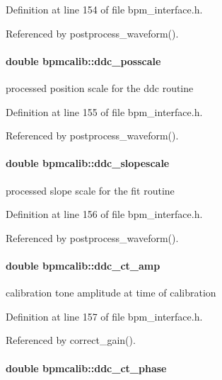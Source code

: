 Definition at line 154 of file bpm\_\-interface.h.

Referenced by postprocess\_\-waveform().
\paragraph[ddc\_\-posscale]{\setlength{\rightskip}{0pt plus 5cm}double {\bf bpmcalib::ddc\_\-posscale}}\hfill\label{structbpmcalib_3ed4fc09eb4f328fe6f3013fe5d83efb}


processed position scale for the ddc routine 

Definition at line 155 of file bpm\_\-interface.h.

Referenced by postprocess\_\-waveform().
\paragraph[ddc\_\-slopescale]{\setlength{\rightskip}{0pt plus 5cm}double {\bf bpmcalib::ddc\_\-slopescale}}\hfill\label{structbpmcalib_04bf942ef5b05de845c388ac355c5fa7}


processed slope scale for the fit routine 

Definition at line 156 of file bpm\_\-interface.h.

Referenced by postprocess\_\-waveform().
\paragraph[ddc\_\-ct\_\-amp]{\setlength{\rightskip}{0pt plus 5cm}double {\bf bpmcalib::ddc\_\-ct\_\-amp}}\hfill\label{structbpmcalib_f5d9554311f52697ee793de6a14efb9c}


calibration tone amplitude at time of calibration 

Definition at line 157 of file bpm\_\-interface.h.

Referenced by correct\_\-gain().
\paragraph[ddc\_\-ct\_\-phase]{\setlength{\rightskip}{0pt plus 5cm}double {\bf bpmcalib::ddc\_\-ct\_\-phase}}\hfill\label{structbpmcalib_2af30b1158dc11d6a7dba61e52b5d11c}


